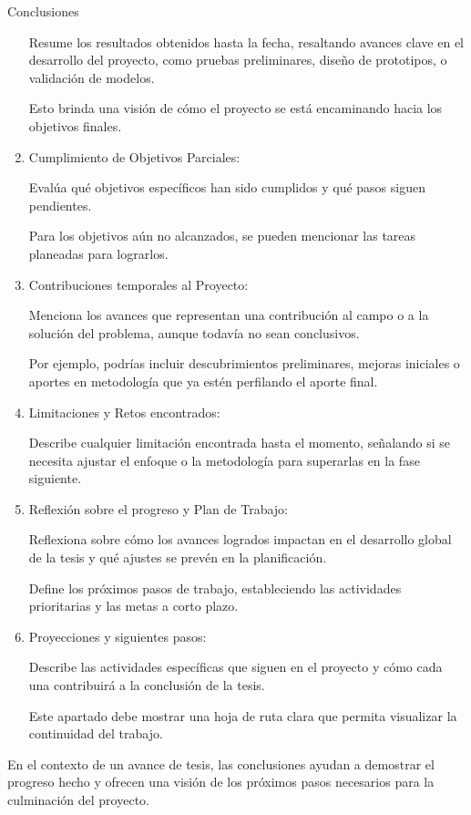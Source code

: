 \documentclass[9pt]{beamer}
\begin{document}
\begin{frame}{Conclusiones}
\begin{enumerate}
    Resume los resultados obtenidos hasta la fecha, resaltando avances clave en el desarrollo del proyecto, como pruebas preliminares, diseño de prototipos, o validación de modelos.

    Esto brinda una visión de cómo el proyecto se está encaminando hacia los objetivos finales.

    \item Cumplimiento de Objetivos Parciales:

    Evalúa qué objetivos específicos han sido cumplidos y qué pasos siguen pendientes.

    Para los objetivos aún no alcanzados, se pueden mencionar las tareas planeadas para lograrlos.
    
    \item Contribuciones temporales al Proyecto:

    Menciona los avances que representan una contribución al campo o a la solución del problema, aunque todavía no sean conclusivos.

    Por ejemplo, podrías incluir descubrimientos preliminares, mejoras iniciales o aportes en metodología que ya estén perfilando el aporte final.

    \item Limitaciones y Retos encontrados:

    Describe cualquier limitación encontrada hasta el momento, señalando si se necesita ajustar el enfoque o la metodología para superarlas en la fase siguiente.

    \item Reflexión sobre el progreso y Plan de Trabajo:

    Reflexiona sobre cómo los avances logrados impactan en el desarrollo global de la tesis y qué ajustes se prevén en la planificación.

    Define los próximos pasos de trabajo, estableciendo las actividades prioritarias y las metas a corto plazo.

    \item Proyecciones y siguientes pasos:

    Describe las actividades específicas que siguen en el proyecto y cómo cada una contribuirá a la conclusión de la tesis.

    Este apartado debe mostrar una hoja de ruta clara que permita visualizar la continuidad del trabajo.
\end{enumerate}

En el contexto de un avance de tesis, las conclusiones ayudan a demostrar el progreso hecho y ofrecen una visión de los próximos pasos necesarios para la culminación del proyecto.
\end{frame}
\end{document}
